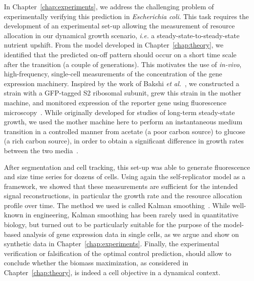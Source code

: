 In Chapter~\ref{chap:experiments}, we address the challenging problem of experimentally verifying this prediction in \textit{Escherichia coli}.
This task requires the development of an experimental set-up allowing the measurement of resource allocation in our dynamical growth scenario, \textit{i.e.} a steady-state-to-steady-state nutrient upshift.
From the model developed in Chapter~\ref{chap:theory}, we identified that the predicted on-off pattern should occur on a short time scale after the transition (a couple of generations).
This motivates the use of \textit{in-vivo}, high-frequency, single-cell measurements of the concentration of the gene expression machinery.
Inspired by the work of Bakshi \textit{et al.}~\cite{bakshi_superresolution_2012}, we constructed a strain with a GFP-tagged S2 ribosomal subunit, grew this strain in the mother machine, and monitored expression of the reporter gene using fluorescence microscopy~\cite{wang_robust_2010}.
While originally developed for studies of long-term steady-state growth, we used the mother machine here to perform an instantaneous medium transition in a controlled manner from acetate (a poor carbon source) to glucose (a rich carbon source), in order to obtain a significant difference in growth rates between the two media~\cite{andersen_are_1980}.

After segmentation and cell tracking, this set-up was able to generate fluorescence and size time series for dozens of cells.
Using again the self-replicator model as a framework, we showed that these measurements are sufficient for the intended signal reconstructions, in particular the growth rate and the resource allocation profile over time.
The method we used is called Kalman smoothing~\cite{kailath_linear_2000,jazwinski_stochastic_2007}.
While well-known in engineering, Kalman smoothing has been rarely used in quantitative biology, but turned out to be particularly suitable for the purpose of the model-based analysis of gene expression data in single cells, as we argue and show on synthetic data in Chapter~\ref{chap:experiments}.
Finally, the experimental verification or falsification of the optimal control prediction, should allow to conclude whether the biomass maximization, as considered in Chapter~\ref{chap:theory}, is indeed a cell objective in a dynamical context.